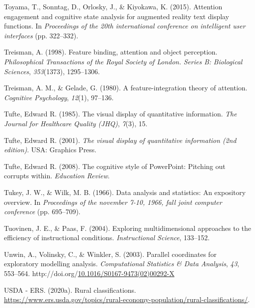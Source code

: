 \documentclass[print]{nuthesis}
\newlength{\cslhangindent}
\newenvironment{CSLReferences}[2]%
{\setlength{\parindent}{0pt}%
\everypar{\setlength{\hangindent}{\cslhangindent}}\ignorespaces}%
{\par}
\begin{document}
\begin{CSLReferences}{1}{0}
\leavevmode{}%
Toyama, T., Sonntag, D., Orlosky, J., \& Kiyokawa, K. (2015). Attention engagement and cognitive state analysis for augmented reality text display functions. In \emph{Proceedings of the 20th international conference on intelligent user interfaces} (pp. 322--332).

\leavevmode{}%
Treisman, A. (1998). Feature binding, attention and object perception. \emph{Philosophical Transactions of the Royal Society of London. Series B: Biological Sciences}, \emph{353}(1373), 1295--1306.

\leavevmode{}%
Treisman, A. M., \& Gelade, G. (1980). A feature-integration theory of attention. \emph{Cognitive Psychology}, \emph{12}(1), 97--136.

\leavevmode{}%
Tufte, Edward R. (1985). The visual display of quantitative information. \emph{The Journal for Healthcare Quality (JHQ)}, \emph{7}(3), 15.

\leavevmode{}%
Tufte, Edward R. (2001). \emph{The visual display of quantitative information (2nd edition)}. USA: Graphics Press.

\leavevmode{}%
Tufte, Edward R. (2008). The cognitive style of PowerPoint: Pitching out corrupts within. \emph{Education Review}.

\leavevmode{}%
Tukey, J. W., \& Wilk, M. B. (1966). Data analysis and statistics: An expository overview. In \emph{Proceedings of the november 7-10, 1966, fall joint computer conference} (pp. 695--709).

\leavevmode{}%
Tuovinen, J. E., \& Paas, F. (2004). Exploring multidimensional approaches to the efficiency of instructional conditions. \emph{Instructional Science}, 133--152.

\leavevmode{}%
Unwin, A., Volinsky, C., \& Winkler, S. (2003). Parallel coordinates for exploratory modelling analysis. \emph{Computational Statistics \& Data Analysis}, \emph{43}, 553--564. http://doi.org/\href{https://doi.org/10.1016/S0167-9473(02)00292-X}{10.1016/S0167-9473(02)00292-X}

\leavevmode{}%
USDA - ERS. (2020a). Rural classifications. \url{https://www.ers.usda.gov/topics/rural-economy-population/rural-classifications/}.


\end{CSLReferences}
\end{document}
